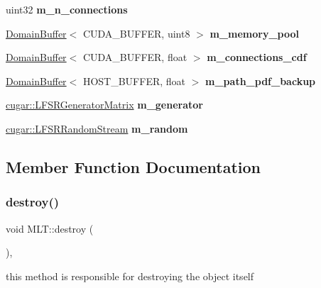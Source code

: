 \begin{DoxyCompactItemize}
uint32 {\bfseries m\+\_\+n\+\_\+connections}
\item 
\mbox{\label{struct_m_l_t_ad0bbf1ef848748789fccf2ba02389fc4}} 
\hyperlink{class_domain_buffer}{Domain\+Buffer}$<$ C\+U\+D\+A\+\_\+\+B\+U\+F\+F\+ER, uint8 $>$ {\bfseries m\+\_\+memory\+\_\+pool}
\item 
\mbox{\label{struct_m_l_t_a91a72f803b153fffdaab71f4028e4e23}} 
\hyperlink{class_domain_buffer}{Domain\+Buffer}$<$ C\+U\+D\+A\+\_\+\+B\+U\+F\+F\+ER, float $>$ {\bfseries m\+\_\+connections\+\_\+cdf}
\item 
\mbox{\label{struct_m_l_t_addf748fe61e7b763d7db6ba1ce3ffa35}} 
\hyperlink{class_domain_buffer}{Domain\+Buffer}$<$ H\+O\+S\+T\+\_\+\+B\+U\+F\+F\+ER, float $>$ {\bfseries m\+\_\+path\+\_\+pdf\+\_\+backup}
\item 
\mbox{\label{struct_m_l_t_a02707979fed2f283805da1189ba03721}} 
\hyperlink{classcugar_1_1_l_f_s_r_generator_matrix}{cugar\+::\+L\+F\+S\+R\+Generator\+Matrix} {\bfseries m\+\_\+generator}
\item 
\mbox{\label{struct_m_l_t_a98e7c0bcc4d66cd31ea7ed94ab4f32db}} 
\hyperlink{structcugar_1_1_l_f_s_r_random_stream}{cugar\+::\+L\+F\+S\+R\+Random\+Stream} {\bfseries m\+\_\+random}
\end{DoxyCompactItemize}


\subsection{Member Function Documentation}
\mbox{\label{struct_m_l_t_adb75fd53b62131575a9f739953eeac67}} 
\subsubsection{\texorpdfstring{destroy()}{destroy()}}
{\footnotesize\ttfamily void M\+L\+T\+::destroy (\begin{DoxyParamCaption}{ }\end{DoxyParamCaption})\hspace{0.3cm}{\ttfamily [inline]}, {\ttfamily [virtual]}}

this method is responsible for destroying the object itself 

